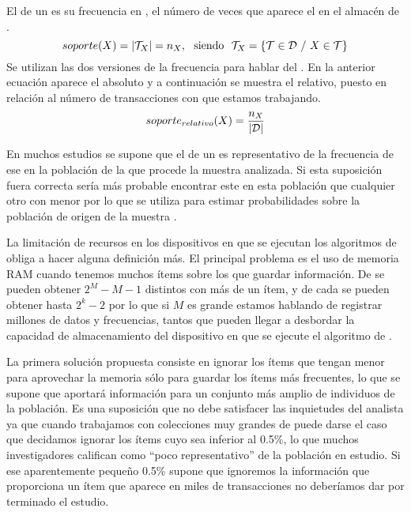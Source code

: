 \begin{Definition}
  El \soporte de un \itemset es su frecuencia en \D, el número de veces que aparece el \itemset en el almacén de \transacciones.
  \begin{equation}\label{eq:1-3-2-soporte-absoluto-itemset}
    soporte(X) = |\T_X| = n_X,\ \textrm{ siendo }\ \T_X =\left\{\T \in \D\ / \ X \in \T\right\}
  \end{equation}   
  Se utilizan las dos versiones de la frecuencia para hablar del \soporte. En la anterior ecuación aparece el \soporte absoluto y a continuación se muestra el \soporte relativo, puesto en relación al número de transacciones con que estamos trabajando.
  \begin{equation}\label{eq:1-3-2-soporte-itemset}
    soporte_{relativo}(X) = \frac{n_X}{|\D|}
  \end{equation}
\label{def:1-3-2-soporte-itemset}
\end{Definition}

En muchos estudios se supone que el \soporte de un \itemset es representativo de la frecuencia de ese \itemset en la población de la que procede la muestra analizada. Si esta suposición fuera correcta sería más probable encontrar este \itemset en esta población que cualquier otro con menor \soporte por lo que se utiliza para estimar probabilidades sobre la población de origen de la muestra \D.


La limitación de recursos en los dispositivos en que se ejecutan los algoritmos de \arm obliga a hacer alguna definición más. El principal problema es el uso de memoria RAM cuando tenemos muchos ítems sobre los que guardar información. De \I se pueden obtener $2^M-M-1$ \itemsets distintos con más de un ítem, y de cada \kitemset se pueden obtener hasta $2^k-2$ \ars por lo que si $M$ es grande estamos hablando de registrar millones de datos y frecuencias, tantos que pueden llegar a desbordar la capacidad de almacenamiento del dispositivo en que se ejecute el algoritmo de \ARM.

La primera solución propuesta consiste en ignorar los ítems que tengan menor \soporte para aprovechar la memoria sólo para guardar los ítems más frecuentes, lo que se supone que aportará información para un conjunto más amplio de individuos de la población. Es una suposición que no debe satisfacer las inquietudes del analista ya que cuando trabajamos con colecciones muy grandes de \transacciones puede darse el caso que decidamos ignorar los ítems cuyo \soporte sea inferior al 0.5\%, lo que muchos investigadores califican como "`poco representativo"' de la población en estudio. Si ese aparentemente pequeño 0.5\% supone que ignoremos la información que proporciona un ítem que aparece en miles de transacciones no deberíamos dar por terminado el estudio.


